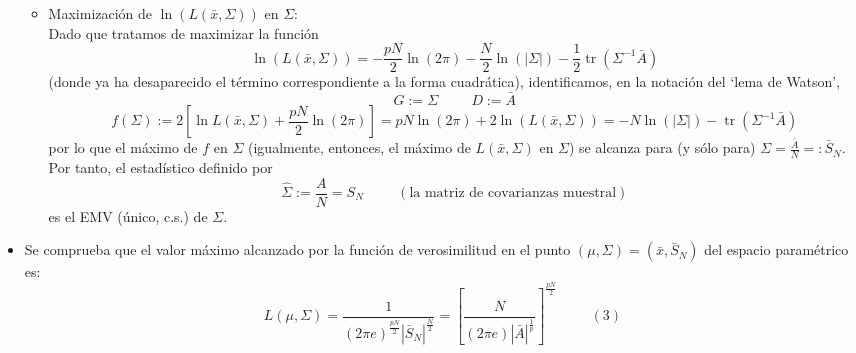 \documentclass[11pt,a4paper]{article}
\begin{document}
\begin{itemize}
\begin{itemize}
\item Maximización de $\ln(L(\bar{x}, \Sigma))$ en $\Sigma$: \\
Dado que tratamos de maximizar la función
$$\ln(L(\bar{x},\Sigma)) = -\frac{pN}{2} \ln(2\pi) - \frac{N}{2}\ln(|\Sigma|) - \frac{1}{2} \operatorname{tr}(\Sigma^{-1}\bar{A})$$
(donde ya ha desaparecido el término correspondiente a la forma cuadrática), identificamos, en la notación del `lema de Watson',
$$G := \Sigma \hspace{1cm} D := \bar{A}$$
$$f(\Sigma) := 2[\ln L(\bar{x}, \Sigma) + \frac{pN}{2}\ln(2\pi)] = pN\ln(2\pi) + 2\ln(L(\bar{x}, \Sigma)) = -N\ln(|\Sigma|) - \operatorname{tr}(\Sigma^{-1}\bar{A})$$
por lo que el máximo de $f$ en $\Sigma$ (igualmente, entonces, el máximo de $L(\bar{x}, \Sigma)$ en $\Sigma$) se alcanza para (y sólo para) $\Sigma = \frac{\bar{A}}{N} =: \bar{S}_{N}$. Por tanto, el estadístico definido por
$$\hat{\Sigma} := \frac{A}{N} = S_{N} \hspace{1cm} (\text{la matriz de covarianzas muestral})$$
es el EMV (único, c.s.) de $\Sigma$.
\end{itemize}

\item Se comprueba que el valor máximo alcanzado por la función de verosimilitud en el punto $(\mu, \Sigma) = (\bar{x}, \bar{S}_{N})$ del espacio paramétrico es:
$$L(\mu, \Sigma) = \frac{1}{(2\pi e)^{\frac{pN}{2}}|\bar{S}_{N}|^{\frac{N}{2}}} = [\frac{N}{(2\pi e)|\bar{A}|^{\frac{1}{p}}}]^{\frac{pN}{2}} \hspace{1cm} (3)$$
\end{itemize}
\end{document}
